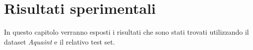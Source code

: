 \chapter{Risultati sperimentali}

In questo capitolo verranno esposti i risultati che sono stati trovati
utilizzando il dataset \textit{Aquaint} e il relativo test set.